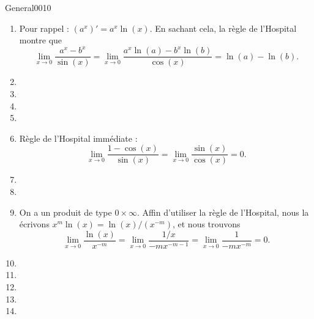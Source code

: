 \begin{corrige}{General0010}
\begin{enumerate}
\item
Pour rappel : $(a^x)'=a^x\ln(x)$. En sachant cela, la règle de l'Hospital montre que
\begin{equation}
	\lim_{x\to 0} \frac{ a^x-b^x }{ \sin(x) }=\lim_{x\to 0} \frac{ a^x\ln(a)-b^x\ln(b) }{ \cos(x) }=\ln(a)-\ln(b).
\end{equation}

\item
\item
\item
\item
\item
Règle de l'Hospital immédiate :
\begin{equation}
	\lim_{x\to 0} \frac{ 1-\cos(x) }{ \sin(x) }=\lim_{x\to 0} \frac{ \sin(x) }{ \cos(x) }=0.
\end{equation}

\item
\item
\item

On a un produit de type $0\times\infty$. Affin d'utiliser la règle de l'Hospital, nous la écrivons $x^m\ln(x)=\ln(x)/(x^{-m})$, et nous trouvons
\begin{equation}
	\lim_{x\to 0} \frac{ \ln(x) }{ x^{-m} }=\lim_{x\to 0} \frac{ 1/x }{ -mx^{-m-1} }=\lim_{x\to 0} \frac{1}{ -mx^{-m} }=0.
\end{equation}


\item
\item
\item
\item
\item

\end{enumerate}

\end{corrige}
